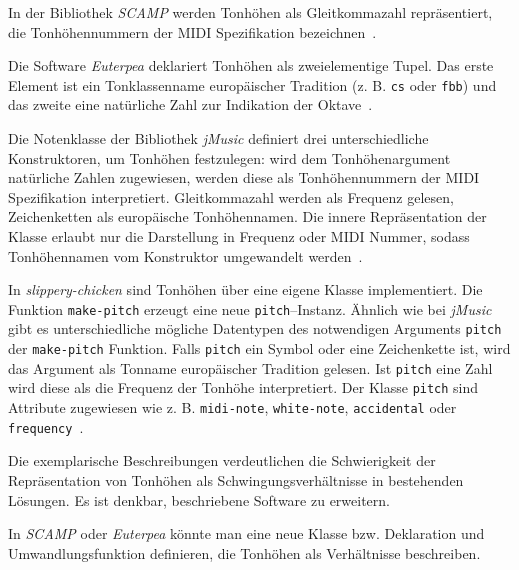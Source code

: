 \documentclass[12pt,a4paper,ngerman]{article}
\begin{document}
\bigskip

\noindent
In der Bibliothek \emph{SCAMP} werden Tonhöhen als Gleitkommazahl repräsentiert, die Tonhöhennummern der MIDI Spezifikation bezeichnen~\parencite{scampNoteLikeDefinition}.

\smallskip

Die Software \emph{Euterpea} deklariert Tonhöhen als zweielementige Tupel.
Das erste Element ist ein Tonklassenname europäischer Tradition (z. B. \texttt{cs} oder \texttt{fbb}) und das zweite eine natürliche Zahl zur Indikation der Oktave~\parencite{euterpeaPitchDefinition}.

\smallskip

Die Notenklasse der Bibliothek \emph{jMusic} definiert drei unterschiedliche Konstruktoren, um Tonhöhen festzulegen:
wird dem Tonhöhenargument natürliche Zahlen zugewiesen, werden diese als Tonhöhennummern der MIDI Spezifikation interpretiert.
Gleitkommazahl werden als Frequenz gelesen, Zeichenketten als europäische Tonhöhennamen.
Die innere Repräsentation der Klasse erlaubt nur die Darstellung in Frequenz oder MIDI Nummer, sodass Tonhöhennamen vom Konstruktor umgewandelt werden~\parencite{jMusicSource}.

\smallskip

In \emph{slippery-chicken} sind Tonhöhen über eine eigene Klasse implementiert.
Die Funktion \texttt{make-pitch} erzeugt eine neue \texttt{pitch}--Instanz.
Ähnlich wie bei \emph{jMusic} gibt es unterschiedliche mögliche Datentypen des notwendigen Arguments \texttt{pitch} der \texttt{make-pitch} Funktion.
Falls \texttt{pitch} ein Symbol oder eine Zeichenkette ist, wird das Argument als Tonname europäischer Tradition gelesen.
Ist \texttt{pitch} eine Zahl wird diese als die Frequenz der Tonhöhe interpretiert.
Der Klasse \texttt{pitch} sind Attribute zugewiesen wie z. B. \texttt{midi-note}, \texttt{white-note}, \texttt{accidental} oder \texttt{frequency}~\parencite{slipperyChickenSource}.

\bigskip

\noindent
Die exemplarische Beschreibungen verdeutlichen die Schwierigkeit der Repräsentation von Tonhöhen als Schwingungsverhältnisse in bestehenden Lösungen.
Es ist denkbar, beschriebene Software zu erweitern.

\smallskip

In \emph{SCAMP} oder \emph{Euterpea} könnte man eine neue Klasse bzw. Deklaration und Umwandlungsfunktion definieren, die Tonhöhen als Verhältnisse beschreiben.

\smallskip
\end{document}
